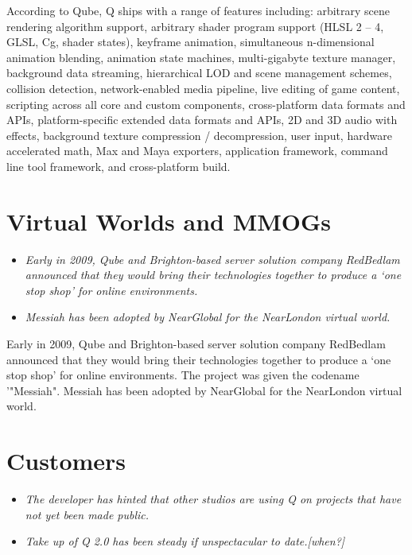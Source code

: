 According to Qube, Q ships with a range of features including: arbitrary
scene rendering algorithm support, arbitrary shader program support
(HLSL 2 -- 4, GLSL, Cg, shader states), keyframe animation, simultaneous
n-dimensional animation blending, animation state machines,
multi-gigabyte texture manager, background data streaming, hierarchical
LOD and scene management schemes, collision detection, network-enabled
media pipeline, live editing of game content, scripting across all core
and custom components, cross-platform data formats and APIs,
platform-specific extended data formats and APIs, 2D and 3D audio with
effects, background texture compression / decompression, user input,
hardware accelerated math, Max and Maya exporters, application
framework, command line tool framework, and cross-platform build.

\section{Virtual Worlds and MMOGs}\label{virtual-worlds-and-mmogs}

\begin{itemize}
\item
  \emph{Early in 2009, Qube and Brighton-based server solution company
  RedBedlam announced that they would bring their technologies together
  to produce a `one stop shop' for online environments.}
\item
  \emph{Messiah has been adopted by NearGlobal for the NearLondon
  virtual world.}
\end{itemize}

Early in 2009, Qube and Brighton-based server solution company RedBedlam
announced that they would bring their technologies together to produce a
`one stop shop' for online environments. The project was given the
codename '"Messiah". Messiah has been adopted by NearGlobal for the
NearLondon virtual world.

\section{Customers}\label{customers}

\begin{itemize}
\item
  \emph{The developer has hinted that other studios are using Q on
  projects that have not yet been made public.}
\item
  \emph{Take up of Q 2.0 has been steady if unspectacular to
  date.{[}when?{]}}
\end{itemize}

